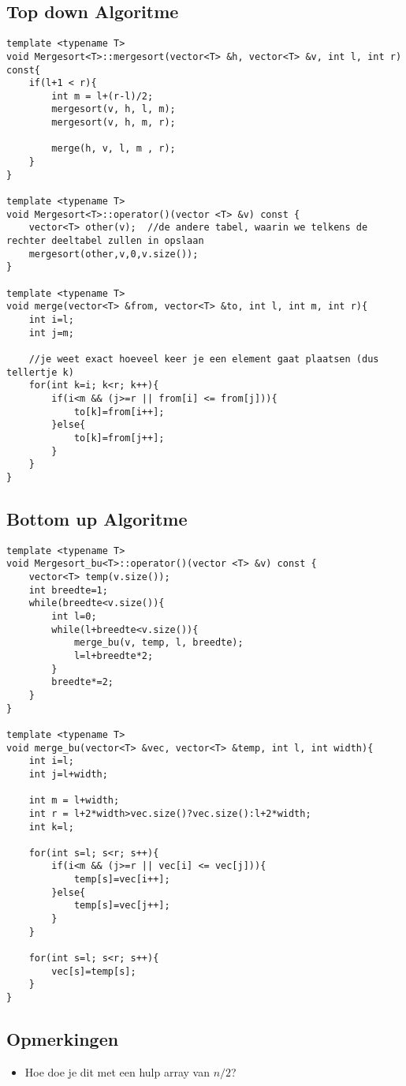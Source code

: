 \documentclass[a4paper]{article}
\begin{document}
\subsection*{Top down Algoritme}
\begin{lstlisting}
template <typename T>
void Mergesort<T>::mergesort(vector<T> &h, vector<T> &v, int l, int r) const{
    if(l+1 < r){
        int m = l+(r-l)/2;
        mergesort(v, h, l, m);
        mergesort(v, h, m, r);

        merge(h, v, l, m , r);
    }
}

template <typename T>
void Mergesort<T>::operator()(vector <T> &v) const {
    vector<T> other(v);  //de andere tabel, waarin we telkens de rechter deeltabel zullen in opslaan
    mergesort(other,v,0,v.size());
}

template <typename T>
void merge(vector<T> &from, vector<T> &to, int l, int m, int r){
    int i=l;
    int j=m;

    //je weet exact hoeveel keer je een element gaat plaatsen (dus tellertje k)
    for(int k=i; k<r; k++){
        if(i<m && (j>=r || from[i] <= from[j])){
            to[k]=from[i++];
        }else{
            to[k]=from[j++];
        }
    }
}
\end{lstlisting}

\subsection*{Bottom up Algoritme}
\begin{lstlisting}
template <typename T>
void Mergesort_bu<T>::operator()(vector <T> &v) const {
    vector<T> temp(v.size());
    int breedte=1;
    while(breedte<v.size()){
        int l=0;
        while(l+breedte<v.size()){
            merge_bu(v, temp, l, breedte);
            l=l+breedte*2;
        }
        breedte*=2;
    }
}

template <typename T>
void merge_bu(vector<T> &vec, vector<T> &temp, int l, int width){
    int i=l;
    int j=l+width;

    int m = l+width;
    int r = l+2*width>vec.size()?vec.size():l+2*width;
    int k=l;

    for(int s=l; s<r; s++){
        if(i<m && (j>=r || vec[i] <= vec[j])){
            temp[s]=vec[i++];
        }else{
            temp[s]=vec[j++];
        }
    }

    for(int s=l; s<r; s++){
        vec[s]=temp[s];
    }
}
\end{lstlisting}
\subsection*{Opmerkingen}
\begin{itemize}
	\item Hoe doe je dit met een hulp array van $n/2$?
\end{itemize}
\newpage
\end{document}
